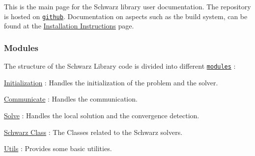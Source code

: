 This is the main page for the Schwarz library user documentation. The repository is hosted on \href{https://github.com/pratikvn/schwarz-lib}{\tt github}. Documentation on aspects such as the build system, can be found at the \hyperlink{install_schwarz}{Installation Instructions} page.

\subsubsection*{Modules}

The structure of the Schwarz Library code is divided into different \href{modules.html}{\tt modules} \+:


\begin{DoxyItemize}
\item \hyperlink{group__init}{Initialization} \+: Handles the initialization of the problem and the solver.
\item \hyperlink{group__comm}{Communicate} \+: Handles the communication.
\item \hyperlink{group__solve}{Solve} \+: Handles the local solution and the convergence detection.
\item \hyperlink{group__schwarz__class}{Schwarz Class} \+: The Classes related to the Schwarz solvers.
\item \hyperlink{group__utils}{Utils} \+: Provides some basic utilities. 
\end{DoxyItemize}